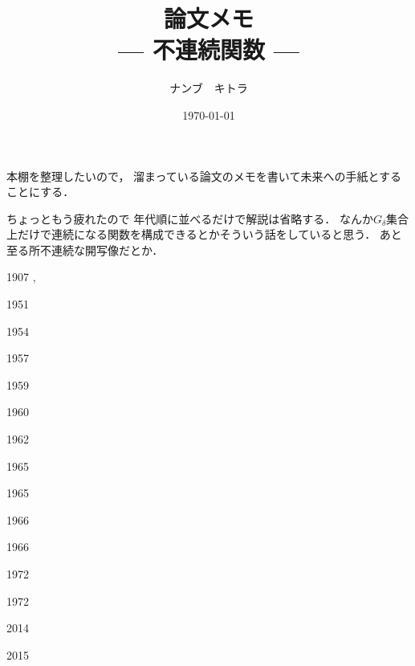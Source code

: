 \documentclass[leqno, a4paper, 12pt]{jsarticle}
\title{論文メモ
\large{\\--- 不連続関数 ---}
}
\author{ナンブ　キトラ}
\date{\today}
\begin{document}
\maketitle

本棚を整理したいので，
溜まっている論文のメモを書いて未来への手紙とすることにする．


ちょっともう疲れたので
年代順に並べるだけで解説は省略する．
なんか$G_{\delta}$集合上だけで連続になる関数を構成できるとかそういう話をしていると思う．
あと至る所不連続な開写像だとか．


1907
\cite{MR1500781},

1951
\cite{MR1527895}

1954
\cite{MR0060814}

1957
\cite{MR0096752}

1959
\cite{MR0104770}

1960
\cite{MR0120325}

1962
\cite{MR0132130}

1965 
\cite{e9605e0d-8517-3259-b578-b495695d6307}


1965
\cite{MR0179302}

1966
\cite{MR0202932}

1966
\cite{MR0197631}

1972 
\cite{MR0301146}

1972
\cite{MR0292041}


2014 
\cite{MR3298752}

2015
\cite{MR3327717}




\nocite{*}


\end{document}
